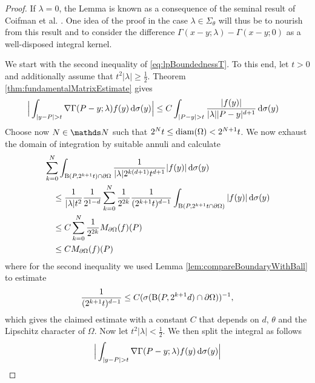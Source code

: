 \begin{proof}
  If $\lambda = 0$, the Lemma is known \cite{fabesKenigVerchota} as a consequence of the seminal result of Coifman et al. \cite{coifmanEtAl}.
  One idea of the proof in the case $\lambda \in \Sigma_\theta$ will thus be to nourish from this result and to consider the difference $\Gamma(x - y; \lambda) - \Gamma(x - y; 0)$ as a well-disposed integral kernel.

  We start with the second inequality of \ref{eq:lpBoundednessT}.
  To this end, let $t > 0$ and additionally assume that $t^2 |\lambda| \geq \frac{1}{2}$. 
  Theorem \ref{thm:fundamentalMatrixEstimate} gives
  \begin{align*}
    \Big| \int_{|y - P| > t} \nabla \Gamma(P - y; \lambda) f(y) \, {\operatorname{d}\!{\sigma}}(y) \Big|
    &\leq C \int_{|P - y| > t} \frac{|f(y)|}{|\lambda| |P - y|^{d + 1}} \, {\operatorname{d}\!{\sigma}}(y) 
  \end{align*}
  Choose now $N \in \N$ such that $2^N t \leq \operatorname{diam}(\Omega) < 2^{N + 1} t$.
  We now exhaust the domain of integration by suitable annuli and calculate
  \begin{align*}
    &\sum_{k = 0}^N \int_{\mathrm{B}(P, 2^{k + 1}t) \cap \partial\Omega} \frac{1}{|\lambda| 2^{k(d + 1)} t^{d + 1}} |f(y)| \, {\operatorname{d}\!{\sigma}}(y) \\
    &\quad\leq \frac{1}{|\lambda|t^2}\frac{1}{2^{1 -d}}\sum_{k = 0}^N \frac{1}{2^{2k}} \frac{1}{(2^{k+1} t)^{d - 1}} \int_{\mathrm{B}(P, 2^{k + 1}t \cap \partial \Omega)}  |f(y)| \, {\operatorname{d}\!{\sigma}}(y) \\
    &\quad\leq C \sum_{k = 0}^N \frac{1}{2^{2k}} M_{\partial\Omega}(f)(P) \\
    &\quad\leq C  M_{\partial\Omega}(f)(P)
  \end{align*}
  where for the second inequality we used Lemma \ref{lem:compareBoundaryWithBall} to estimate
  \begin{align*}
    \frac{1}{(2^{k+1} t)^{d-1}} \leq C (\sigma(\mathrm{B}(P, 2^{k + 1}d) \cap \partial\Omega))^{-1},
  \end{align*}
  which gives the claimed estimate with a constant $C$ that depends on $d$, $\theta$ and the Lipschitz character of $\Omega$.
  Now let $t^2 |\lambda| < \frac{1}{2}$.
  We then split the integral as follows
  \begin{align*}
    &\Big| \int_{|y - P| > t} \nabla \Gamma(P - y; \lambda) f(y) \d\sigma(y) \Big| \\

\end{align*}
\end{proof}
